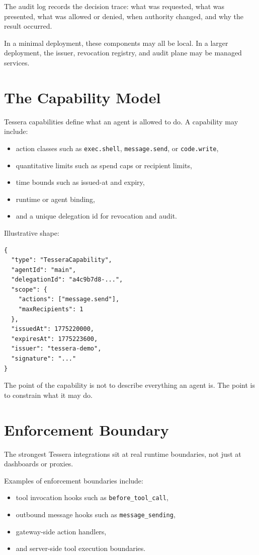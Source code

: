 \documentclass[11pt, a4paper]{article}
\begin{document}
The audit log records the decision trace: what was requested, what was presented, what was allowed or denied, when authority changed, and why the result occurred.

In a minimal deployment, these components may all be local. In a larger deployment, the issuer, revocation registry, and audit plane may be managed services.

\section{The Capability Model}

Tessera capabilities define what an agent is allowed to do. A capability may include:

\begin{itemize}
  \item action classes such as \texttt{exec.shell}, \texttt{message.send}, or \texttt{code.write},
  \item quantitative limits such as spend caps or recipient limits,
  \item time bounds such as issued-at and expiry,
  \item runtime or agent binding,
  \item and a unique delegation id for revocation and audit.
\end{itemize}

Illustrative shape:

\begin{lstlisting}
{
  "type": "TesseraCapability",
  "agentId": "main",
  "delegationId": "a4c9b7d8-...",
  "scope": {
    "actions": ["message.send"],
    "maxRecipients": 1
  },
  "issuedAt": 1775220000,
  "expiresAt": 1775223600,
  "issuer": "tessera-demo",
  "signature": "..."
}
\end{lstlisting}

The point of the capability is not to describe everything an agent is. The point is to constrain what it may do.

\section{Enforcement Boundary}

The strongest Tessera integrations sit at real runtime boundaries, not just at dashboards or proxies.

Examples of enforcement boundaries include:

\begin{itemize}
  \item tool invocation hooks such as \texttt{before\_tool\_call},
  \item outbound message hooks such as \texttt{message\_sending},
  \item gateway-side action handlers,
  \item and server-side tool execution boundaries.
\end{itemize}
\end{document}
